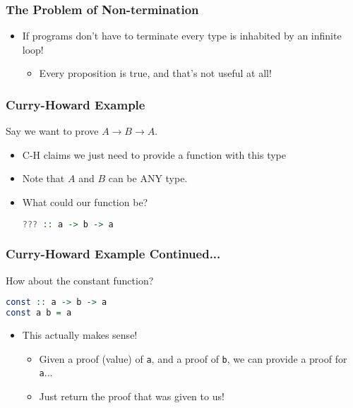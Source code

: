 \documentclass{beamer}
\begin{document}
\begin{frame}
  \frametitle{The Problem of Non-termination}
  \begin{itemize}
  \item If programs don't have to terminate every type is inhabited by an infinite loop!
  \begin{itemize} \item \alert{Every proposition is true, and that's not useful at all!} \end{itemize}
  \end{itemize}
\end{frame}

\begin{frame}[fragile]
  \frametitle{Curry-Howard Example}
  Say we want to prove $A \rightarrow B \rightarrow A$.

  \begin{itemize}
  \item C-H claims we just need to provide a function with this type
  \item<2-> Note that $A$ and $B$ can be ANY type.
  \item<3-> What could our function be?

\begin{lstlisting}[frame=single, language=Haskell, breaklines=true]
??? :: a -> b -> a
\end{lstlisting}
    
  \end{itemize}
\end{frame}

\begin{frame}[fragile]
  \frametitle{Curry-Howard Example Continued...}

How about the constant function?

\begin{lstlisting}[frame=single, language=Haskell, breaklines=true]
const :: a -> b -> a
const a b = a
\end{lstlisting}

\pause

\begin{itemize}
\item This actually makes sense!

  \begin{itemize}
  \item Given a proof (value) of \texttt{a}, and a proof of \texttt{b}, we can provide a proof for \texttt{a}...
  \item Just return the proof that was given to us!
  \end{itemize}
\end{itemize}
\end{frame}
\end{document}

